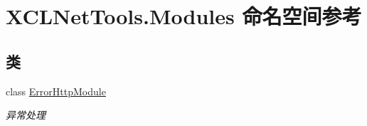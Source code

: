 \hypertarget{namespace_x_c_l_net_tools_1_1_modules}{}\section{X\+C\+L\+Net\+Tools.\+Modules 命名空间参考}
\label{namespace_x_c_l_net_tools_1_1_modules}
\subsection*{类}
\begin{DoxyCompactItemize}
\item 
class \hyperlink{class_x_c_l_net_tools_1_1_modules_1_1_error_http_module}{Error\+Http\+Module}
\begin{DoxyCompactList}\small\item\em 异常处理 \end{DoxyCompactList}\end{DoxyCompactItemize}
